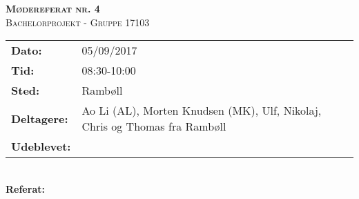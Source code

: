 
\newcommand{\HRule}{\rule{\linewidth}{0.1mm}}


	\begin{center}
		{\huge \bfseries \textsc{Mødereferat nr. 4}}\\
		\textsc{\large Bachelorprojekt - Gruppe 17103}\\[0.3cm]
	\end{center}
	\begin{tabular}{ll}
	\large \textbf{Dato:} & 05/09/2017  	\\ %
	\large \textbf{Tid:}  & 08:30-10:00 	\\ %
	\large \textbf{Sted:} & Rambøll		\\ %
	\large \textbf{Deltagere:} & Ao Li (AL), Morten Knudsen (MK), Ulf, Nikolaj, Chris og Thomas fra Rambøll \\
	\large \textbf{Udeblevet:}
	\end{tabular}\\
	\phantom{\,}\hspace{0.1em} \large \textbf{Referat:}
